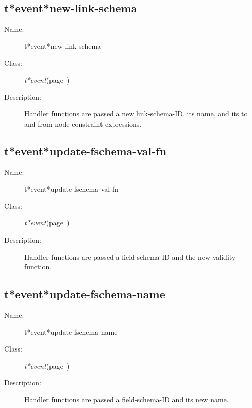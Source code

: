 \subsection{t*event*new-link-schema}
\label{t*event*new-link-schema}

\begin{description}
\item [Name:]  t*event*new-link-schema

\item [Class:] {\sl t*event}\hfill(page~\pageref{t*event})

\item [Description:]

Handler functions are passed a new link-schema-ID,
its name, and its to and from node constraint expressions.



\end{description}
\horizontalline

\subsection{t*event*update-fschema-val-fn}
\label{t*event*update-fschema-val-fn}

\begin{description}
\item [Name:]  t*event*update-fschema-val-fn

\item [Class:] {\sl t*event}\hfill(page~\pageref{t*event})

\item [Description:]

Handler functions are passed a field-schema-ID and
the new validity function.




\end{description}
\horizontalline

\subsection{t*event*update-fschema-name}
\label{t*event*update-fschema-name}

\begin{description}
\item [Name:]  t*event*update-fschema-name

\item [Class:] {\sl t*event}\hfill(page~\pageref{t*event})

\item [Description:]

Handler functions are passed a field-schema-ID and
its new name.


\end{description}
\horizontalline

